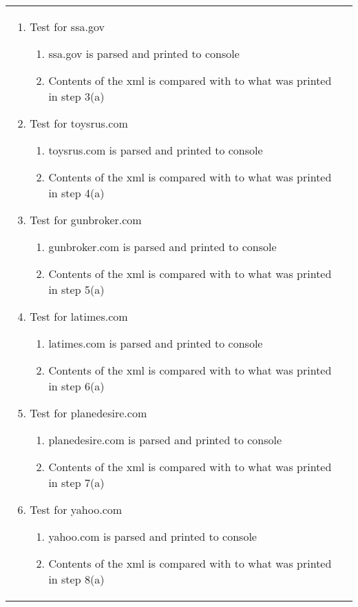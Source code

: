 \begin{center}
\begin{longtable}{ | p{4cm} | p{10cm} | }
\begin{enumerate}
							\item Test for ssa.gov
							\begin{enumerate}
								\item ssa.gov is parsed and printed to console
								\item Contents of the xml is compared with to what was printed in step 3(a)
							\end{enumerate}

							\item Test for toysrus.com
							\begin{enumerate}
								\item toysrus.com is parsed and printed to console
								\item Contents of the xml is compared with to what was printed in step 4(a)
							\end{enumerate}

							\item Test for gunbroker.com
							\begin{enumerate}
								\item gunbroker.com is parsed and printed to console
								\item Contents of the xml is compared with to what was printed in step 5(a)
							\end{enumerate}

							\item Test for latimes.com
							\begin{enumerate}
								\item latimes.com is parsed and printed to console
								\item Contents of the xml is compared with to what was printed in step 6(a)
							\end{enumerate}

							\item Test for planedesire.com
							\begin{enumerate}
								\item planedesire.com is parsed and printed to console
								\item Contents of the xml is compared with to what was printed in step 7(a)
							\end{enumerate}

							\item  Test for yahoo.com
							\begin{enumerate}
								\item yahoo.com is parsed and printed to console
								\item Contents of the xml is compared with to what was printed in step 8(a)
							\end{enumerate}


\end{enumerate}
\end{longtable}
\end{center}
